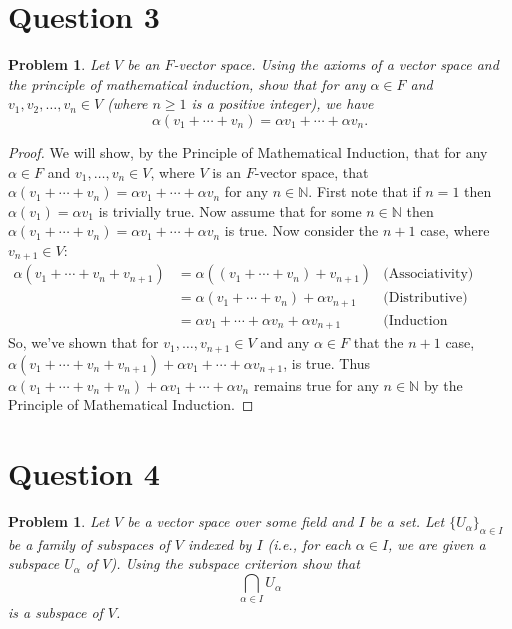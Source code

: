 \documentclass[12pt, letterpaper]{article}
\theoremstyle{plain}
\newtheorem{prob}[theorem]{Problem}
\theoremstyle{definition}
\theoremstyle{remark}
\begin{document}
\section{Question 3}

\begin{prob}
Let $V$ be an $F$-vector space. Using the axioms of a vector space and the principle of mathematical induction, show that for any $\alpha\in F$ and $v_1,v_2,\ldots,v_n\in V$ (where $n\ge 1$ is a positive integer), we have $$\alpha(v_1+\cdots+v_n)=\alpha v_1+\cdots+\alpha v_n.$$
\end{prob}

\begin{proof}
    We will show, by the Principle of Mathematical Induction, that for any $\alpha\in F$ and $v_1,\ldots,v_n\in V$, where $V$ is an $F$-vector space, that $\alpha(v_1+\cdots+v_n)=\alpha v_1+\cdots+\alpha v_n$ for any $n\in\mathbb{N}$. First note that if $n=1$ then $\alpha(v_1)=\alpha v_1$ is trivially true. Now assume that for some $n\in\mathbb{N}$ then $\alpha(v_1+\cdots+v_n)=\alpha v_1+\cdots+\alpha v_n$ is true. Now consider the $n+1$ case, where $v_{n+1}\in V$:
    \begin{align*}
        \alpha(v_1+\cdots+v_n+v_{n+1}) &= \alpha((v_1+\cdots+v_n)+v_{n+1}) &\text{(Associativity)} \\
                                       &= \alpha(v_1+\cdots+v_n)+\alpha v_{n+1} &\text{(Distributive)} \\
                                       &= \alpha v_1+\cdots+\alpha v_n+\alpha v_{n+1} &\text{(Induction Hypothesis)}
    \end{align*}
    So, we've shown that for $v_1,\ldots,v_{n+1}\in V$ and any $\alpha \in F$ that the $n+1$ case, $\alpha(v_1+\cdots+v_n+v_{n+1})+\alpha v_1+\cdots+\alpha v_{n+1}$, is true. Thus $\alpha(v_1+\cdots+v_n+v_n)+\alpha v_1+\cdots+\alpha v_n$ remains true for any $n\in\mathbb{N}$ by the Principle of Mathematical Induction.
\end{proof}

\section{Question 4}

\begin{prob}
Let $V$ be a vector space over some field and $I$ be a set. Let $\{U_\alpha\}_{\alpha\in I}$ be a family of subspaces of $V$ indexed by $I$ (i.e., for each $\alpha\in I$, we are given a subspace $U_\alpha$ of $V$). Using the subspace criterion show that $$\bigcap_{\alpha\in I}U_\alpha$$ is a subspace of $V$.
\end{prob}
\end{document}
